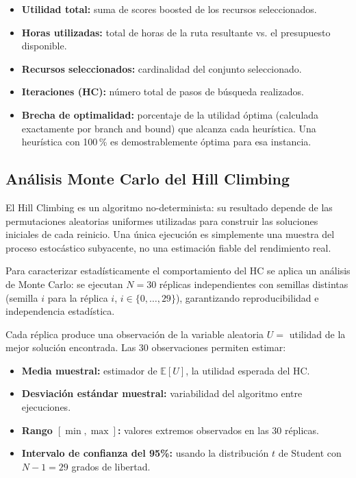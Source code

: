 \documentclass[11pt, a4paper]{article}
\begin{document}
\begin{itemize}[leftmargin=1.5em]
  \item \textbf{Utilidad total:} suma de scores boosted de los recursos seleccionados.
  \item \textbf{Horas utilizadas:} total de horas de la ruta resultante vs. el presupuesto disponible.
  \item \textbf{Recursos seleccionados:} cardinalidad del conjunto seleccionado.
  \item \textbf{Iteraciones (HC):} número total de pasos de búsqueda realizados.
  \item \textbf{Brecha de optimalidad:} porcentaje de la utilidad óptima
        (calculada exactamente por branch and bound) que alcanza cada heurística.
        Una heurística con 100\,\% es demostrablemente óptima para esa instancia.
\end{itemize}

\subsection{Análisis Monte Carlo del Hill Climbing}

El Hill Climbing es un algoritmo no-determinista: su resultado depende de las permutaciones aleatorias uniformes utilizadas para construir las soluciones iniciales de cada reinicio. Una única ejecución es simplemente una muestra del proceso estocástico subyacente, no una estimación fiable del rendimiento real.

Para caracterizar estadísticamente el comportamiento del HC se aplica un análisis de Monte Carlo: se ejecutan $N = 30$ réplicas independientes con semillas distintas (semilla $i$ para la réplica $i$, $i \in \{0, \dots, 29\}$), garantizando reproducibilidad e independencia estadística.

Cada réplica produce una observación de la variable aleatoria $U = $ utilidad de la mejor solución encontrada. Las 30 observaciones permiten estimar:

\begin{itemize}[leftmargin=1.5em]
  \item \textbf{Media muestral:} estimador de $\mathbb{E}[U]$, la utilidad esperada del HC.
  \item \textbf{Desviación estándar muestral:} variabilidad del algoritmo entre ejecuciones.
  \item \textbf{Rango $[\min, \max]$:} valores extremos observados en las 30 réplicas.
  \item \textbf{Intervalo de confianza del 95\%:} usando la distribución $t$ de Student con $N-1 = 29$ grados de libertad.
\end{itemize}
\end{document}
